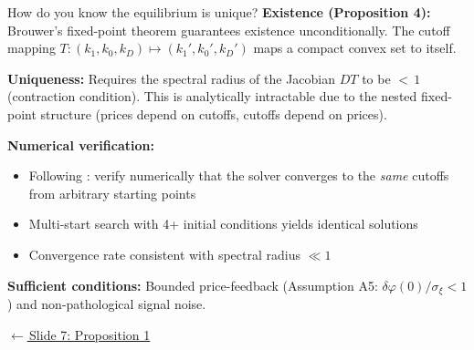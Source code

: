 \documentclass[aspectratio=169,10pt]{beamer}
\newcommand{\1}{\mathbf{1}}
\newcommand{\returnlink}[2]{%
  \par\vspace{0.2em}\hfill{\scriptsize\hyperlink{#1}{\textcolor{brightblue}{$\leftarrow$\,#2}}}%
}
\begin{document}
\begin{frame}{How do you know the equilibrium is unique?}
\hypertarget{backup:uniqueness}{}
\small
\textbf{Existence (Proposition 4):} Brouwer's fixed-point theorem guarantees existence unconditionally. The cutoff mapping $T: (k_1, k_0, k_D) \mapsto (k_1', k_0', k_D')$ maps a compact convex set to itself.

\vspace{0.3em}

\textbf{Uniqueness:} Requires the spectral radius of the Jacobian $DT$ to be ${<}\,1$ (contraction condition). This is analytically intractable due to the nested fixed-point structure (prices depend on cutoffs, cutoffs depend on prices).

\vspace{0.3em}

\textbf{Numerical verification:}
\begin{itemize}\itemsep0.1em
  \item Following \citealp{EdmansGoldsteinJiang2015}: verify numerically that the solver converges to the \emph{same} cutoffs from arbitrary starting points
  \item Multi-start search with 4+ initial conditions yields identical solutions
  \item Convergence rate consistent with spectral radius $\ll 1$
\end{itemize}

\vspace{0.3em}

\textbf{Sufficient conditions:} Bounded price-feedback (Assumption A5: $\delta\varphi(0)/\sigma_\xi < 1$) and non-pathological signal noise.

\returnlink{main:prop1}{Slide 7: Proposition 1}
\end{frame}
\end{document}
